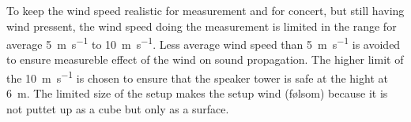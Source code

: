 To keep the wind speed realistic for measurement and for concert, but still having wind pressent, the wind speed doing the measurement is limited in the range for average \SI{5}{\meter\per\second} to \SI{10}{\meter\per\second}. Less average wind speed than \SI{5}{\meter\per\second} is avoided to ensure measureble effect of the wind on sound propagation. The higher limit of the \SI{10}{\meter\per\second} is chosen to ensure that the speaker tower is safe at the hight at \SI{6}{\meter}. The limited size of the setup makes the setup wind (følsom) because it is not puttet up as a cube but only as a surface. 
